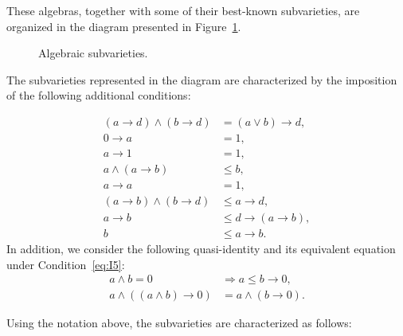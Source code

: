 \documentclass[10pt,a4paper]{amsart}
\begin{document}
These algebras, together with some of their best-known subvarieties, are organized in the diagram presented in Figure~\ref{fig:varieties}. 

\begin{figure}[ht]
\centering
{}
\caption{Algebraic subvarieties.}
\label{fig:varieties}
\end{figure}

The subvarieties represented in the diagram are characterized by the imposition of the following
additional conditions:

\begin{align}
(a \to d) \wedge (b \to d) &= (a \lor b) \to d,
    \tag{I2}\label{eq:I2}\\
0 \to a &= 1,
    \tag{I3}\label{eq:I3}\\
a \to 1 &= 1,
    \tag{I4}\label{eq:I4}\\
a \wedge (a \to b) &\le b,
    \tag{I5}\label{eq:I5}\\
a \to a &= 1,
    \tag{I6}\label{eq:I6}\\
(a \to b) \wedge (b \to d) &\le a \to d,
    \tag{I7}\label{eq:I7}\\
a \to b &\le d \to (a \to b),
    \tag{I8}\label{eq:I8}\\
b &\le a \to b.
    \tag{I9}\label{eq:I9}
\end{align}
In addition, we consider the following quasi-identity and its equivalent equation under Condition~\eqref{eq:I5}:
\begin{align}
a \wedge b = 0 &\Longrightarrow a \le b \to 0,
    \tag{A}\label{eq:A}\\
a \wedge ((a \wedge b)\to 0) &= a \wedge (b \to 0).
    \tag{A'}\label{eq:Aprime}
\end{align}

Using the notation above, the subvarieties are characterized as follows:
\end{document}
